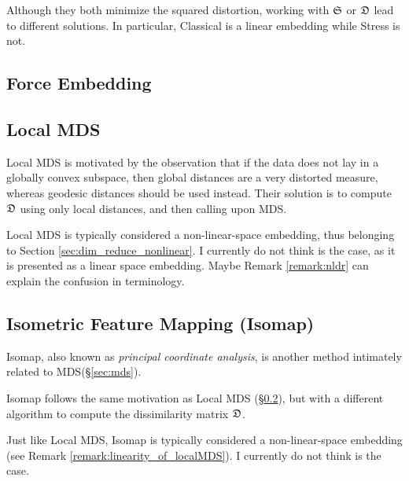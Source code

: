 \documentclass[12pt,a4paper]{article}
\begin{document}
\begin{remark}
	Although they both minimize the squared distortion, working with $\mathfrak{S}$ or $\mathfrak{D}$ lead to different solutions. 
	In particular, Classical is a linear embedding while Stress is not. 
\end{remark}





\subsection{Force Embedding}




\subsection{Local MDS}
\label{sec:localMDS}
Local MDS is motivated by the observation that if the data does not lay in a globally convex subspace, then global distances are a very distorted measure, whereas geodesic distances should be used instead. 
Their solution is to compute $\mathfrak{D}$ using only local distances, and then calling upon MDS.

\begin{remark}
	\label{remark:linearity_of_localMDS}
	Local MDS is typically considered a non-linear-space embedding, thus belonging to Section \ref{sec:dim_reduce_nonlinear}.
	I currently do not think is the case, as it is presented as a linear space embedding.
	Maybe Remark \ref{remark:nldr} can explain the confusion in terminology.
\end{remark}






\subsection{Isometric Feature Mapping (Isomap)}
\label{sec:isomap}

Isomap, also known as \emph{principal coordinate analysis}, is another method intimately related to MDS(\S\ref{sec:mds}).

Isomap follows the same motivation as Local MDS (\S\ref{sec:localMDS}), but with a different algorithm to compute the dissimilarity matrix $\mathfrak{D}$.

\begin{remark}
	Just like Local MDS, Isomap is typically considered a non-linear-space embedding (see Remark \ref{remark:linearity_of_localMDS}).
	I currently do not think is the case.
\end{remark}
\end{document}
